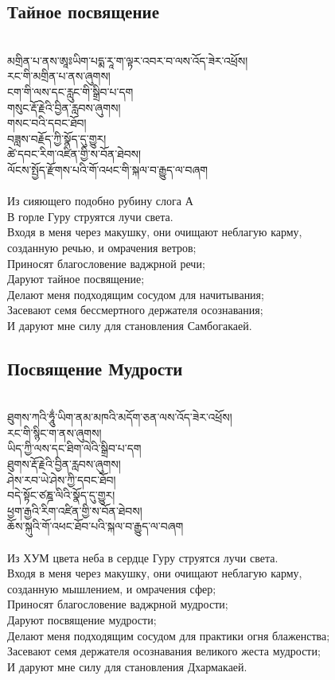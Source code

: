 \subsection{Тайное посвящение}
\\
\ti
མགྲིན་པ་ནས་ཨཱཿཡིག་པདྨ་རཱ་ག་ལྟར་འབར་བ་ལས་འོད་ཟེར་འཕྲོས།\\
རང་གི་མགྲིན་པ་ནས་ཞུགས།\\
ངག་གི་ལས་དང་རླུང་གི་སྒྲིབ་པ་དག\\
གསུང་རྡོ་རྗེའི་བྱིན་རླབས་ཞུགས།\\
གསང་བའི་དབང་ཐོབ།\\
བཟླས་བརྗོད་ཀྱི་སྣོད་དུ་གྱུར།\\
ཚེ་དབང་རིག་འཛིན་གྱི་ས་བོན་ཐེབས།\\
ལོངས་སྤྱོད་རྫོགས་པའི་གོ་འཕང་གི་སྐལ་བ་རྒྱུད་ལ་བཞག\\
\\
\ru
Из сияющего подобно рубину слога А\\
В горле Гуру струятся лучи света. \\
Входя в меня через макушку, они очищают неблагую карму,\\
созданную речью, и омрачения ветров;\\
Приносят благословение ваджрной речи;\\
Даруют тайное посвящение;\\
Делают меня подходящим сосудом для начитывания;\\
Засевают семя бессмертного держателя осознавания;\\
И даруют мне силу для становления Самбогакаей.

\newpage
\subsection{Посвящение Мудрости}
\\
\ti
ཐུགས་ཀའི་ཧཱུྂ་ཡིག་ནམ་མཁའི་མདོག་ཅན་ལས་འོད་ཟེར་འཕྲོས།\\
རང་གི་སྙིང་ག་ནས་ཞུགས།\\
ཡིད་ཀྱི་ལས་དང་ཐིག་ལེའི་སྒྲིབ་པ་དག\\
ཐུགས་རྡོ་རྗེའི་བྱིན་རླབས་ཞུགས།\\
ཤེས་རབ་ཡེ་ཤེས་ཀྱི་དབང་ཐོབ།\\
བདེ་སྟོང་ཙཎྜ་ལིའི་སྣོད་དུ་གྱུར།\\
ཕྱག་རྒྱའི་རིག་འཛིན་གྱི་ས་བོན་ཐེབས།\\
ཆོས་སྐུའི་གོ་འཕང་ཐོབ་པའི་སྐལ་བ་རྒྱུད་ལ་བཞག\\
\\
\ru
Из ХУМ цвета неба в сердце Гуру струятся лучи света.\\
Входя в меня через макушку, они очищают неблагую карму,\\
созданную мышлением, и омрачения сфер;\\
Приносят благословение ваджрной мудрости;\\
Даруют посвящение мудрости;\\
Делают меня подходящим сосудом для практики огня блаженства;\\
Засевают семя держателя осознавания великого жеста мудрости;\\
И даруют мне силу для становления Дхармакаей.

